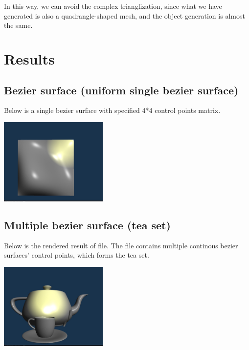 \documentclass[acmtog]{acmart}
\newcommand{\code}[1]{\texttt{\color{magenta}{#1}}} %
\begin{document}
In this way, we can avoid the complex trianglization, since what we have generated is also a quadrangle-shaped mesh, and the object generation is almost the same.


\newpage

\section{Results}

\subsection{Bezier surface (uniform single bezier surface)}

Below is a single bezier surface with specified 4*4 control points matrix.

\begin{center}
	\includegraphics[width=0.4\textwidth]{./images/bezier-surface.jpg}
\end{center}

\subsection{Multiple bezier surface (tea set)}

Below is the rendered result of \code{assets/tea.bzs} file. The file contains multiple continous bezier surfaces' control points, which forms the tea set. 

\begin{center}
	\includegraphics[width=0.4\textwidth]{./images/bezier-tea-set.jpg}
\end{center}
\end{document}
